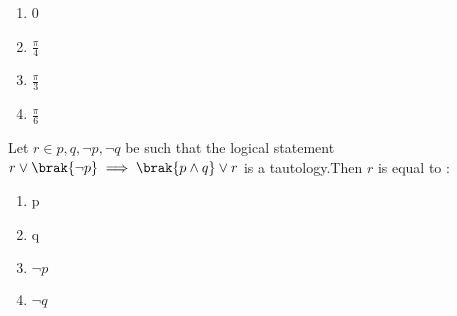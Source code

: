     \begin{enumerate}
        \item 0
        \item $\frac{\pi}{4}$
        \item $\frac{\pi}{3}$
        \item $\frac{\pi}{6}$
    \end{enumerate}
    \hfill{}
    \item[5.] Let $r \in {p,q,\neg p,\neg q}$ be such that the logical statement $r\lor \brak{\neg p}\implies\brak{p\land q}\lor r$ is a tautology.Then $r$ is equal to :
    \begin{enumerate}
        \item p
        \item q
        \item $\neg p$
        \item $\neg q$
    \end{enumerate}
    \hfill{}
